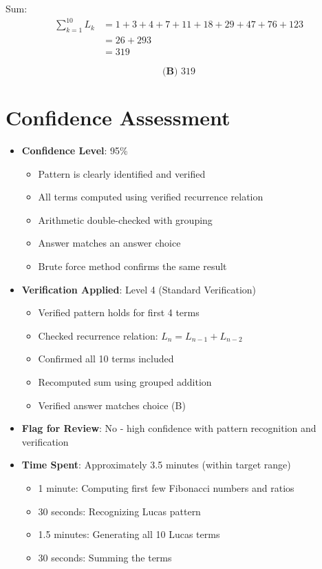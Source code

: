 \documentclass[12pt]{article}
\begin{document}
Sum:
\begin{align*}
    \sum_{k=1}^{10} L_k &= 1 + 3 + 4 + 7 + 11 + 18 + 29 + 47 + 76 + 123 \\
    &= 26 + 293 \\
    &= 319
\end{align*}

$$\boxed{\textbf{(B) } 319}$$

\section*{Confidence Assessment}
\begin{itemize}[leftmargin=*]
    \item \textbf{Confidence Level}: 95\%
    \begin{itemize}
        \item Pattern is clearly identified and verified
        \item All terms computed using verified recurrence relation
        \item Arithmetic double-checked with grouping
        \item Answer matches an answer choice
        \item Brute force method confirms the same result
    \end{itemize}
    
    \item \textbf{Verification Applied}: Level 4 (Standard Verification)
    \begin{itemize}
        \item Verified pattern holds for first 4 terms
        \item Checked recurrence relation: $L_n = L_{n-1} + L_{n-2}$
        \item Confirmed all 10 terms included
        \item Recomputed sum using grouped addition
        \item Verified answer matches choice (B)
    \end{itemize}
    
    \item \textbf{Flag for Review}: No - high confidence with pattern recognition and verification
    
    \item \textbf{Time Spent}: Approximately 3.5 minutes (within target range)
    \begin{itemize}
        \item 1 minute: Computing first few Fibonacci numbers and ratios
        \item 30 seconds: Recognizing Lucas pattern
        \item 1.5 minutes: Generating all 10 Lucas terms
        \item 30 seconds: Summing the terms
    \end{itemize}
\end{itemize}
\end{document}

